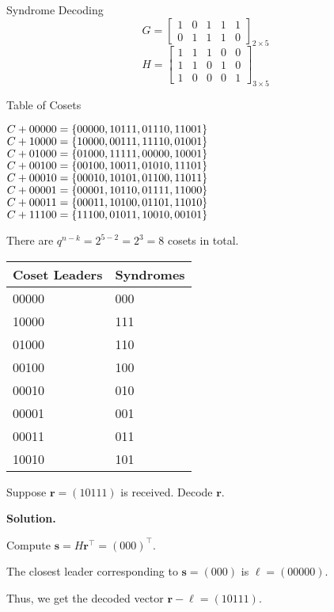 \begin{Example}{Syndrome Decoding}{}
    \[ G=\begin{bmatrix}
            1 & 0 & 1 & 1 & 1 \\
            0 & 1 & 1 & 1 & 0
        \end{bmatrix}_{2\times 5} \]
    \[ H=\begin{bmatrix}
            1 & 1 & 1 & 0 & 0 \\
            1 & 1 & 0 & 1 & 0 \\
            1 & 0 & 0 & 0 & 1
        \end{bmatrix}_{3\times 5} \]
    \begin{table}[H]
        \centering
        \caption{Table of Cosets}
        \begin{multicols}{2}
            $ C+00000=\{00000,10111,01110,11001\} $\\
            $ C+10000=\{10000,00111,11110,01001\} $\\
            $ C+01000=\{01000,11111,00000,10001\} $\\
            $ C+00100=\{00100,10011,01010,11101\} $\\
            $ C+00010=\{00010,10101,01100,11011\} $\\
            $ C+00001=\{00001,10110,01111,11000\} $\\
            $ C+00011=\{00011,10100,01101,11010\} $\\
            $ C+11100=\{11100,01011,10010,00101\} $
        \end{multicols}
    \end{table}
    There are $ q^{n-k}=2^{5-2}=2^3=8 $ cosets in total.
    \begin{table}[H]
        \centering
        \begin{tabularx}{0.5\linewidth}{@{}YY@{}}
            Coset Leaders & Syndromes \\
                     & 000       \\
            10000         & 111       \\
            01000         & 110       \\
            00100         & 100       \\
            00010         & 010       \\
            00001         & 001       \\
            00011         & 011       \\
            10010         & 101
        \end{tabularx}
    \end{table}
    Suppose $ \symbf{r}=(10111) $ is received. Decode $ \symbf{r} $.

    \textbf{Solution.}

    Compute $ \symbf{s}=H\symbf{r}^\top=(000)^\top $.

    The closest leader corresponding to $ \symbf{s}=(000) $ is $ \symbf{\ell}=(00000) $.

    Thus, we get the decoded vector $ \symbf{r}-\symbf{\ell}=(10111) $.
\end{Example}
